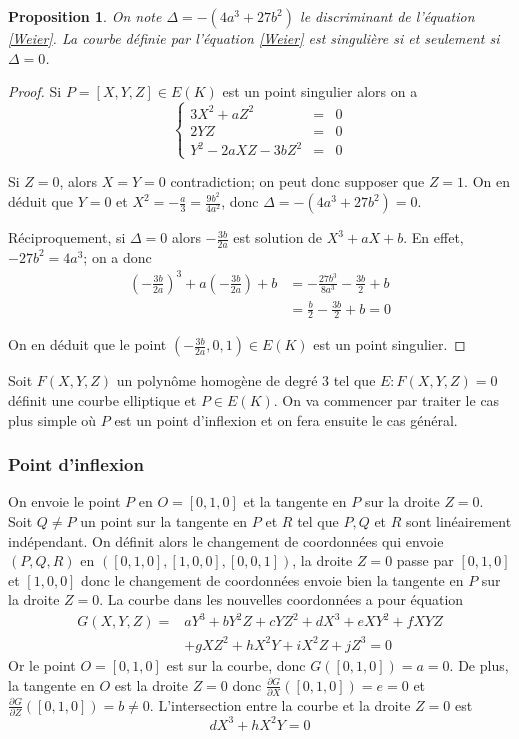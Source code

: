 \documentclass{article}
\newtheorem{proposition}{Proposition}
\begin{document}
\begin{proposition}
On note $\Delta = -(4a^3+27b^2)$ le discriminant de l'équation \ref{Weier}.
La courbe définie par l'équation \ref{Weier} est singulière si et seulement si $\Delta = 0$.
\end{proposition}

\begin{proof}
Si $P=[X,Y,Z]\in E(K)$ est un point singulier alors on a
\begin{equation*}
\left\lbrace
\begin{array}{lcl}
3X^2 + aZ^2 &=& 0\\
2YZ &=& 0 \\
Y^2 - 2aXZ - 3bZ^2 &=& 0
\end{array}\right.
\end{equation*}

Si $Z=0$, alors $X=Y=0$ contradiction; on peut donc supposer que $Z=1$. On en déduit que $Y=0$ et 
$X^2 = -\frac{a}{3} = \frac{9b^2}{4a^2}$, donc $\Delta = -(4a^3+27b^2) = 0$.

Réciproquement, si $\Delta = 0$ alors $-\frac{3b}{2a}$ est solution de $X^3+aX+b$. En effet, $-27b^2=4a^3$; on a donc
\begin{align*}
(-\frac{3b}{2a})^3 + a(-\frac{3b}{2a}) + b &=  -\frac{27b^3}{8a^3} -\frac{3b}{2} + b\\
			   &= \frac{b}{2} -\frac{3b}{2} + b = 0
\end{align*}

On en déduit que le point $(-\frac{3b}{2a}, 0, 1) \in E(K)$ est un point singulier.
\end{proof}

Soit $F(X,Y,Z)$ un polynôme homogène de degré $3$ tel que $E: F(X,Y,Z)=0$ définit une courbe elliptique et
$P\in E(K)$. On va commencer par traiter le cas plus simple où $P$ est un point d'inflexion et on fera ensuite
le cas général.

\subsubsection{Point d'inflexion}
On envoie le point $P$ en $O=[0,1,0]$ et la tangente en $P$ sur la droite $Z=0$. Soit $Q\neq P$ un point sur la tangente
en $P$ et $R$ tel que $P,Q$ et $R$ sont linéairement indépendant. On définit alors le changement de coordonnées qui envoie $(P,Q,R)$
en $([0,1,0], [1,0,0], [0,0,1])$, la droite $Z=0$ passe par $[0,1,0]$ et $[1,0,0]$ donc le changement de coordonnées
envoie bien la tangente en $P$ sur la droite $Z=0$. La courbe dans les nouvelles coordonnées a pour équation
\begin{align*}
G(X,Y,Z) = &aY^3 + bY^2Z + cYZ^2 + dX^3 + eXY^2 + fXYZ \\
			& + gXZ^2 + hX^2Y + iX^2Z + jZ^3 = 0
\end{align*}
Or le point $O=[0,1,0]$ est sur la courbe, donc $G([0,1,0])=a=0$. De plus, la tangente en $O$ est la droite $Z=0$
donc $\frac{\partial G}{\partial X}([0,1,0])=e=0$ et $\frac{\partial G}{\partial Z}([0,1,0])=b\neq 0$.
L'intersection entre la courbe et la droite $Z=0$ est
\begin{equation*}
dX^3 + hX^2Y = 0
\end{equation*}
\end{document}
